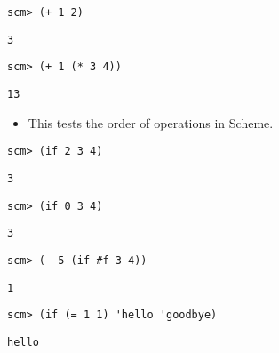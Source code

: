 \begin{blocksection}
\begin{lstlisting}
scm> (+ 1 2)
\end{lstlisting}
\begin{solution}[.25in]
\texttt{3}
\end{solution}

\begin{lstlisting}
scm> (+ 1 (* 3 4))
\end{lstlisting}
\begin{solution}[.25in]
\texttt{13}
\end{solution}
\begin{guide}
\begin{itemize}
\item This tests the order of operations in Scheme.
\end{itemize}
\end{guide}

\end{blocksection}
\begin{blocksection}

\begin{lstlisting}
scm> (if 2 3 4)
\end{lstlisting}
\begin{solution}[.25in]
\texttt{3}
\end{solution}

\begin{lstlisting}
scm> (if 0 3 4)
\end{lstlisting}
\begin{solution}[.25in]
\texttt{3}
\end{solution}

\begin{lstlisting}
scm> (- 5 (if #f 3 4))
\end{lstlisting}
\begin{solution}[.25in]
\texttt{1}
\end{solution}


\begin{comment}
\begin{lstlisting}
scm> (if nil 3 4)
\end{lstlisting}
\begin{solution}[.25in]
\texttt{3}
\end{solution}
\end{comment}

\begin{lstlisting}
scm> (if (= 1 1) 'hello 'goodbye)
\end{lstlisting}
\begin{solution}[.25in]
\texttt{hello}
\end{solution}
\end{blocksection}

